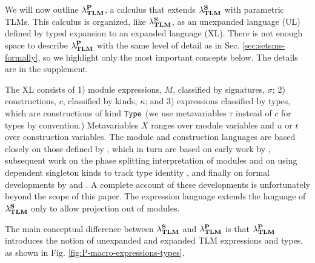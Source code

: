 \documentclass[acmsmall,review,anonymous]{acmart}\settopmatter{printfolios=true,printccs=false,printacmref=false}
\begin{document}
We will now outline $\mathsf{\lambda}_\textbf{TLM}^\textbf{P}$, a calculus that extends $\mathsf{\lambda}_\textbf{TLM}^\textbf{S}$ with parametric TLMs. This calculus is organized, like $\mathsf{\lambda}_\textbf{TLM}^\textbf{S}$, as an unexpanded language (UL) defined by typed expansion to an expanded language (XL). There is not enough space to describe $\mathsf{\lambda}_\textbf{TLM}^\textbf{P}$ with the same level of detail as in Sec. \ref{sec:setsms-formally}, so we highlight only the most important concepts below. The details are in the supplement.

The XL consists of 1) module expressions, $M$, classified by signatures, $\sigma$; 2) constructions, $c$, classified by kinds, $\kappa$; and 3) expressions classified by types, which are constructions of kind $\texttt{Type}$ (we use metavariables $\tau$ instead of $c$ for types by convention.) Metavariables $X$ ranges over module variables and $u$ or $t$ over construction variables. The module and construction languages are based closely on those defined by \citet{pfple1}, which in turn are based on early work by \citet{MacQueen:1984:MSM:800055.802036,DBLP:conf/popl/MacQueen86}, subsequent work on the phase splitting interpretation of modules \cite{harper1989higher} and on using dependent singleton kinds to track type identity \cite{stone2006extensional,DBLP:conf/lfmtp/Crary09}, and finally on formal developments by \citet{dreyer2005understanding} and \citet{conf/popl/LeeCH07}. A complete account of these developments is unfortunately beyond the scope of this paper. The expression language extends the language of $\mathsf{\lambda}_\textbf{TLM}^\textbf{S}$ only to allow projection out of modules.

The main conceptual difference between $\mathsf{\lambda}_\textbf{TLM}^\textbf{S}$ and $\mathsf{\lambda}_\textbf{TLM}^\textbf{P}$ is that $\mathsf{\lambda}_\textbf{TLM}^\textbf{P}$ introduces the notion of unexpanded and expanded TLM expressions and types, as shown in Fig. \ref{fig:P-macro-expressions-types}. 
\end{document}
